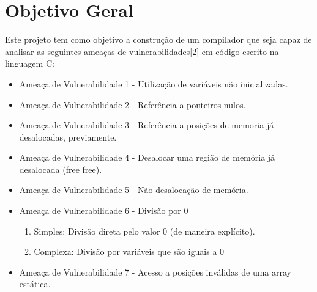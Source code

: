 \section{Objetivo Geral}
Este projeto tem como objetivo a construção de um compilador que seja capaz de analisar as seguintes ameaças de vulnerabilidades[2] em código escrito na linguagem C:
\begin{itemize}
\item Ameaça de Vulnerabilidade 1 - Utilização de variáveis não inicializadas.
\item Ameaça de Vulnerabilidade 2 - Referência a ponteiros nulos.
\item Ameaça de Vulnerabilidade 3 - Referência a posições de memoria já desalocadas, previamente.
\item Ameaça de Vulnerabilidade 4 - Desalocar uma região de memória já desalocada (free free).
\item Ameaça de Vulnerabilidade 5 - Não desalocação de memória.
\item Ameaça de Vulnerabilidade 6 - Divisão por 0
\begin{enumerate}
\item Simples: Divisão direta pelo valor 0 (de maneira explícito).
\item Complexa: Divisão por variáveis que são iguais a 0
\end{enumerate}
\item Ameaça de Vulnerabilidade 7 - Acesso a posições inválidas de uma array estática.
\end{itemize}

